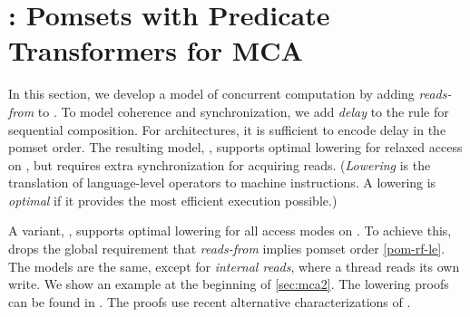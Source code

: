 \section{\PwTmcaTITLE{}: Pomsets with Predicate Transformers for MCA}
\label{sec:mca}

In this section, we develop a model of concurrent computation by adding
\emph{reads-from} to .  To model coherence and
synchronization, we add \emph{delay} to the rule for sequential composition.
For \mca{} architectures, it is sufficient to encode delay in the pomset
order.  The resulting model, , supports optimal lowering for
relaxed access on \armeight{}, but requires extra synchronization for
acquiring reads.  (\emph{Lowering} is the translation of language-level
operators to machine instructions.  A lowering is \emph{optimal} if it
provides the most efficient execution possible.)

A variant, , supports optimal lowering for all access modes on
\armeight{}.  To achieve this,  drops the global requirement that
\emph{reads-from} implies pomset order \eqref{pom-rf-le}.  The models are the
same, except for \emph{internal reads}, where a thread reads its own write.
We show an example at the beginning of \textsection\ref{sec:mca2}.
%
The lowering proofs can be found in .  The proofs
use recent alternative characterizations of \armeight{} \cite{armed}.

\subsection{}
\label{sec:mca1}

